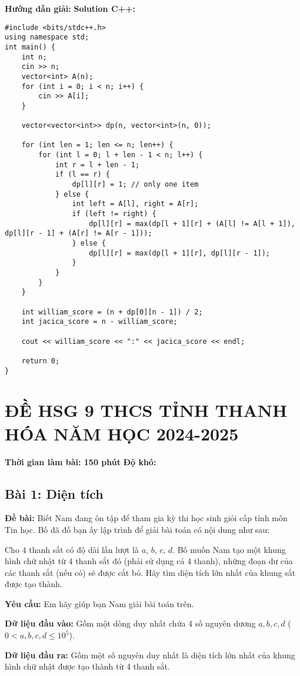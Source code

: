 \documentclass[12pt]{scrartcl}  %
\begin{document}
\textbf{Hướng dẫn giải:}
\textbf{Solution C++:}
\begin{lstlisting}
#include <bits/stdc++.h>
using namespace std;
int main() {
    int n;
    cin >> n;
    vector<int> A(n);
    for (int i = 0; i < n; i++) {
        cin >> A[i];
    }

    vector<vector<int>> dp(n, vector<int>(n, 0));
    
    for (int len = 1; len <= n; len++) {
        for (int l = 0; l + len - 1 < n; l++) {
            int r = l + len - 1;
            if (l == r) {
                dp[l][r] = 1; // only one item
            } else {
                int left = A[l], right = A[r];
                if (left != right) {
                    dp[l][r] = max(dp[l + 1][r] + (A[l] != A[l + 1]), dp[l][r - 1] + (A[r] != A[r - 1]));
                } else {
                    dp[l][r] = max(dp[l + 1][r], dp[l][r - 1]);
                }
            }
        }
    }

    int william_score = (n + dp[0][n - 1]) / 2;
    int jacica_score = n - william_score;

    cout << william_score << ":" << jacica_score << endl;

    return 0;
}
\end{lstlisting}

\section{ĐỀ HSG 9 THCS TỈNH THANH HÓA NĂM HỌC 2024-2025}
\textbf{Thời gian làm bài: 150 phút}
\textbf{Độ khó: }
\subsection{Bài 1: Diện tích}
\textbf{Đề bài:}
Biết Nam đang ôn tập để tham gia kỳ thi học sinh giỏi cấp tỉnh môn Tin học. Bố đã đố bạn ấy lập trình để giải bài toán có nội dung như sau:

Cho $4$ thanh sắt có độ dài lần lượt là $a$, $b$, $c$, $d$. Bố muốn Nam tạo một khung hình chữ nhật từ $4$ thanh sắt đó (phải sử dụng cả 4 thanh), những đoạn dư của các thanh sắt 
(nếu có) sẽ được cắt bỏ. Hãy tìm diện tích lớn nhất của khung sắt được tạo thành.

\textbf{Yêu cầu:}
Em hãy giúp bạn Nam giải bài toán trên.

\textbf{Dữ liệu đầu vào:}
Gồm một dòng duy nhất chứa 4 số nguyên dương $a, b, c, d$ ($0 < a, b, c, d \leq 10^5$).

\textbf{Dữ liệu đầu ra:}
Gồm một số nguyên duy nhất là diện tích lớn nhất của khung hình chữ nhật được tạo thành từ 4 thanh sắt.
\end{document}
